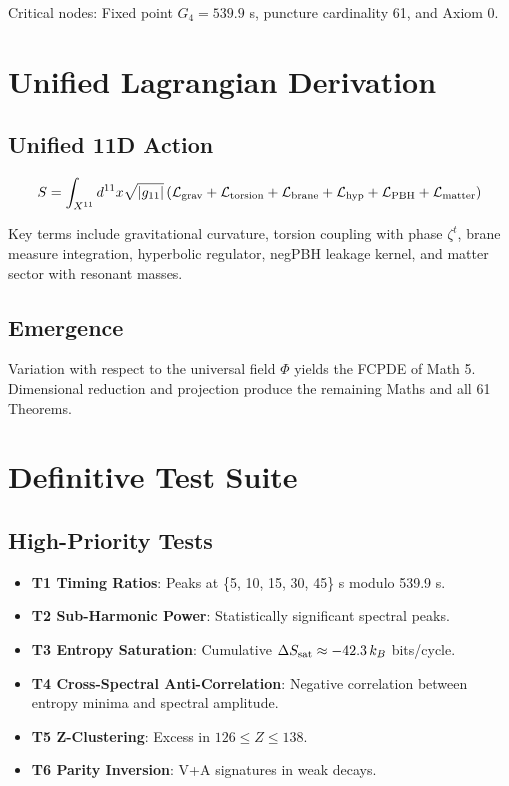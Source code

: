 \documentclass[11pt,a4paper]{book}
\theoremstyle{remark}
\theoremstyle{definition}
\begin{document}
Critical nodes: Fixed point \(G_4 = 539.9\) s, puncture cardinality 61, and Axiom 0.

\chapter{Unified Lagrangian Derivation}

\section{Unified 11D Action}

\[ S = \int_{X^{11}} d^{11}x \sqrt{|g_{11}|} \left( \mathcal{L}_{\rm grav} + \mathcal{L}_{\rm torsion} + \mathcal{L}_{\rm brane} + \mathcal{L}_{\rm hyp} + \mathcal{L}_{\rm PBH} + \mathcal{L}_{\rm matter} \right) \]

Key terms include gravitational curvature, torsion coupling with phase \(\zeta^t\), brane measure integration, hyperbolic regulator, negPBH leakage kernel, and matter sector with resonant masses.

\section{Emergence}

Variation with respect to the universal field \(\Phi\) yields the FCPDE of Math 5. Dimensional reduction and projection produce the remaining Maths and all 61 Theorems.

\chapter{Definitive Test Suite}

\section{High-Priority Tests}

\begin{itemize}
    \item \textbf{T1 Timing Ratios}: Peaks at \{5, 10, 15, 30, 45\} s modulo 539.9 s.
    \item \textbf{T2 Sub-Harmonic Power}: Statistically significant spectral peaks.
    \item \textbf{T3 Entropy Saturation}: Cumulative \(\Delta S_{\rm sat} \approx -42.3 \, k_B\) bits/cycle.
    \item \textbf{T4 Cross-Spectral Anti-Correlation}: Negative correlation between entropy minima and spectral amplitude.
    \item \textbf{T5 Z-Clustering}: Excess in \(126 \le Z \le 138\).
    \item \textbf{T6 Parity Inversion}: V+A signatures in weak decays.
\end{itemize}
\end{document}
